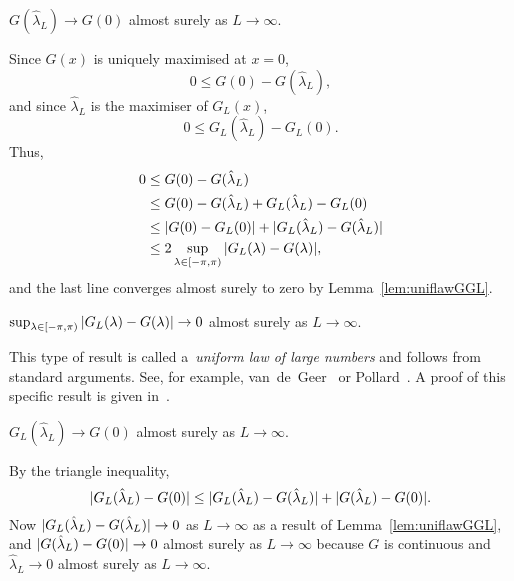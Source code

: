 \documentclass[draftcls, onecolumn, 11pt]{IEEEtran}
\begin{document}
\begin{lemma}\label{lem:convtoexpGlamL} 
$G(\hat{\lambda}_L) \rightarrow G(0)$ almost surely as $L \rightarrow \infty$.
\end{lemma}
\begin{IEEEproof}
Since $G(x)$ is uniquely maximised at $x=0$,
\[
0 \leq G(0) - G(\hat{\lambda}_L),
\]
and since $\hat{\lambda}_L$ is the maximiser of $G_L(x)$,
\[ 
0 \leq G_L(\hat{\lambda}_L) - G_L(0).
\]
Thus,
\begin{align*}
0 &\leq G(0) - G(\hat{\lambda}_L) \\ 
& \leq G(0) - G(\hat{\lambda}_L) + G_L(\hat{\lambda}_L) - G_L(0) \\
& \leq |G(0) - G_L(0)| + |G_L(\hat{\lambda}_L) - G(\hat{\lambda}_L)| \\
&\leq 2\sup_{\lambda \in [-\pi, \pi)} {\vert G_L(\lambda) - G(\lambda) \vert},
\end{align*}
and the last line converges almost surely to zero by Lemma~\ref{lem:uniflawGGL}.
\end{IEEEproof}

\begin{lemma}\label{lem:uniflawGGL} 
$\sup_{\lambda \in [-\pi, \pi)}{\vert G_L(\lambda) - G(\lambda) \vert} \rightarrow 0$ almost surely as $L \rightarrow \infty$.
\end{lemma}
\begin{IEEEproof}
This type of result is called a~\emph{uniform law of large numbers} and follows from standard arguments.  See, for example, van~de~Geer~\cite[Ch.~3]{van2009empirical} or Pollard~\citep[Ch.~2]{Pollard_conv_stat_proc_1984}.  A proof of this specific result is given in~\cite[Lemma~2]{McKilliam_leastsqPSKpilotsdata_arxiv}.
\end{IEEEproof}

\begin{lemma}\label{lem:GLtoG0}
$G_L(\hat{\lambda}_L) \rightarrow G(0)$ almost surely as $L \rightarrow \infty$.
\end{lemma}
\begin{IEEEproof}
By the triangle inequality,
\[
{\vert G_L(\hat{\lambda}_L) - G(0) \vert} \leq {\vert G_L(\hat{\lambda}_L) - G(\hat{\lambda}_L) \vert} + {\vert G(\hat{\lambda}_L) - G(0) \vert}.
\]
Now ${\vert G_L(\hat{\lambda}_L) - G(\hat{\lambda}_L) \vert} \rightarrow 0$ as $L \rightarrow \infty$ as a result of Lemma~\ref{lem:uniflawGGL}, and ${\vert G(\hat{\lambda}_L) - G(0) \vert} \rightarrow 0$ almost surely as $L \rightarrow \infty$ because $G$ is continuous and $\hat{\lambda}_L \rightarrow 0$ almost surely as $L \rightarrow \infty$.
\end{IEEEproof}
\end{document}
